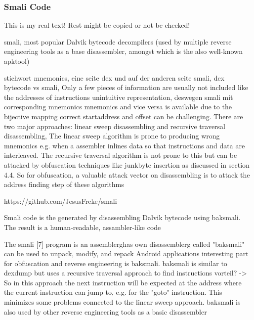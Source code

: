 \subsubsection{Smali Code}\label{subsubsection:tools-baksmali}
This is my real text! Rest might be copied or not be checked!

%
smali, most popular Dalvik bytecode decompilers (used by multiple reverse engineering tools as a base disassembler, amongst which is the also well-known apktool)
\cite{kovachevaMaster}
%

stichwort mnemonics, eine seite dex und auf der anderen seite smali, dex bytecode vs smali, Only a few pieces of information are usually not included like the addresses of instructions\newline
unintuitive representation, deswegen smali mit corresponding mnemonics\newline
mnemonics and vice versa is available due to the bijective mapping\newline
correct startaddress and offset can be challenging. There are two major approaches: linear sweep disassembling and recursive traversal disassembling, The linear sweep algorithm is prone to producing wrong mnemonics e.g. when a assembler inlines data so that instructions and data are interleaved. The recursive traversal algorithm is not prone to this but can be attacked by obfuscation techniques like junkbyte insertion as discussed in section 4.4. So for obfuscation, a valuable attack vector on disassembling is to attack the address finding step of these algorithms\newline

https://github.com/JesusFreke/smali

Smali code is the generated by disassembling Dalvik bytecode using baksmali. The result is a human-readable, assambler-like code

The smali [7] program is an \gls{assemblerg}has own \gls{disassemblerg} called "baksmali"\newline
can be used to unpack, modify, and repack Android applications\newline
interesting part for obfuscation and reverse engineering is baksmali. baksmali is similar to dexdump but uses a recursive traversal approach to find instructions\newline
vorteil? -> So in this approach the next instruction will be expected at the address where the current instruction can jump to, e.g. for the "goto" instruction. This minimizes some problems connected to the linear sweep approach. baksmali is also used by other reverse engineering tools as a basic disassembler\newline

